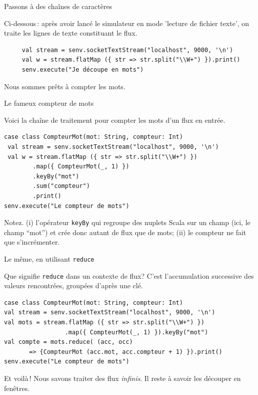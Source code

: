 \begin{frame}[fragile]{Passons à des chaînes de caractères}

Ci-dessous\,: après avoir lancé le simulateur en mode 'lecture de fichier texte',
on traite les lignes de texte constituant le flux.

\vfill
\begin{verbatim}
     val stream = senv.socketTextStream("localhost", 9000, '\n')
     val w = stream.flatMap ({ str => str.split("\\W+") }).print()
     senv.execute("Je découpe en mots")
\end{verbatim}

\vfill

Nous sommes prêts à compter les mots.
\end{frame}

\begin{frame}[fragile]{Le fameux compteur de mots}

Voici la chaîne de traitement pour compter les mots d'un flux en entrée.
\vfill

\begin{verbatim}
case class CompteurMot(mot: String, compteur: Int)
 val stream = senv.socketTextStream("localhost", 9000, '\n')
 val w = stream.flatMap ({ str => str.split("\\W+") })
        .map({ CompteurMot(_, 1) })
        .keyBy("mot")
        .sum("compteur")
        .print()
senv.execute("Le compteur de mots")
\end{verbatim}

\vfill
\begin{blocgauche}
Notez.  (i) l'opérateur \texttt{keyBy} qui regroupe des nuplets Scala sur un champ (ici, le champ ``mot'') 
et crée donc autant de flux que de mots; (ii) le compteur ne fait que s'incrémenter.
\end{blocgauche}
\end{frame}


\begin{frame}[fragile]{Le même, en utilisant \texttt{reduce}}

Que signifie \texttt{reduce} dans un contexte de flux? C'est l'accumulation
successive des valeurs rencontrées, groupées d'après une clé.

\vfill

\begin{verbatim}
case class CompteurMot(mot: String, compteur: Int)
val stream = senv.socketTextStream("localhost", 9000, '\n')
val mots = stream.flatMap ({ str => str.split("\\W+") })
                 .map({ CompteurMot(_, 1) }).keyBy("mot")
val compte = mots.reduce( (acc, occ)  
       => {CompteurMot (acc.mot, acc.compteur + 1) }).print()
senv.execute("Le compteur de mots")
\end{verbatim}

\vfill
\begin{blocgauche}
Et voilà\,! Nous savons traiter des flux \emph{infinis}. Il reste à savoir
les découper en \alert{fenêtres}.
\end{blocgauche}
\end{frame}

